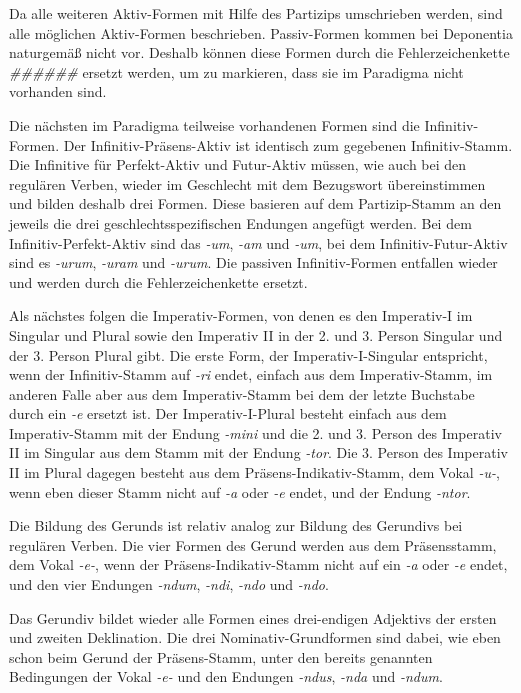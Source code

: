 \documentclass[fontsize=12pt,abstract=on,titlepage,bibliography=totoc,ngerman,listof=totoc]{scrreprt}
\begin{document}
Da alle weiteren Aktiv-Formen mit Hilfe des Partizips umschrieben werden, sind alle möglichen Aktiv-Formen beschrieben. Passiv-Formen kommen bei Deponentia naturgemäß nicht vor. Deshalb können diese Formen durch die Fehlerzeichenkette \textit{\#\#\#\#\#\#} ersetzt werden, um zu markieren, dass sie im Paradigma nicht vorhanden sind. \par
Die nächsten im Paradigma teilweise vorhandenen Formen sind die Infinitiv-Formen. Der Infinitiv-Präsens-Aktiv ist identisch zum gegebenen Infinitiv-Stamm. Die Infinitive für Perfekt-Aktiv und Futur-Aktiv müssen, wie auch bei den regulären Verben, wieder im Geschlecht mit dem Bezugswort übereinstimmen und bilden deshalb drei Formen. Diese basieren auf dem Partizip-Stamm an den jeweils die drei geschlechtsspezifischen Endungen angefügt werden. Bei dem Infinitiv-Perfekt-Aktiv sind das \textit{-um}, \textit{-am} und \textit{-um}, bei dem Infinitiv-Futur-Aktiv sind es \textit{-urum}, \textit{-uram} und \textit{-urum}. Die passiven Infinitiv-Formen entfallen wieder und werden durch die Fehlerzeichenkette ersetzt. \par
Als nächstes folgen die Imperativ-Formen, von denen es den Imperativ-I im Singular und Plural sowie den Imperativ II in der 2. und 3. Person Singular und der 3. Person Plural gibt. Die erste Form, der Imperativ-I-Singular entspricht, wenn der Infinitiv-Stamm auf \textit{-ri} endet, einfach aus dem Imperativ-Stamm, im anderen Falle aber aus dem Imperativ-Stamm bei dem der letzte Buchstabe durch ein \textit{-e} ersetzt ist. Der Imperativ-I-Plural besteht einfach aus dem Imperativ-Stamm mit der Endung \textit{-mini} und die 2. und 3. Person des Imperativ II im Singular aus dem Stamm mit der Endung \textit{-tor}. Die 3. Person des Imperativ II im Plural dagegen besteht aus dem Präsens-Indikativ-Stamm, dem Vokal \textit{-u-}, wenn eben dieser Stamm nicht auf \textit{-a} oder \textit{-e} endet, und der Endung \textit{-ntor}. \par
Die Bildung des Gerunds ist relativ analog zur Bildung des Gerundivs bei regulären Verben. Die vier Formen des Gerund werden aus dem Präsensstamm, dem Vokal \textit{-e-}, wenn der Präsens-Indikativ-Stamm nicht auf ein \textit{-a} oder \textit{-e} endet, und den vier Endungen \textit{-ndum}, \textit{-ndi}, \textit{-ndo} und \textit{-ndo}. \par
Das Gerundiv bildet wieder alle Formen eines drei-endigen Adjektivs der ersten und zweiten Deklination. Die drei Nominativ-Grundformen sind dabei, wie eben schon beim Gerund der Präsens-Stamm, unter den bereits genannten Bedingungen der Vokal \textit{-e-} und den Endungen \textit{-ndus}, \textit{-nda} und \textit{-ndum}. \par
\end{document}
